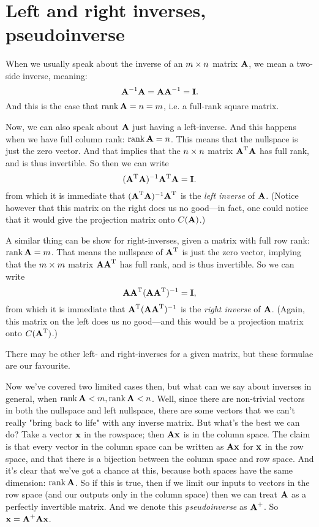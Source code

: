 \section{Left and right inverses, pseudoinverse}

When we usually speak about the inverse of an $m \times n$ matrix $\boldsymbol{\mathbf{A}}$, we mean a two-side inverse, meaning:
\[ \boldsymbol{\mathbf{A}}^{-1}\boldsymbol{\mathbf{A}} = \boldsymbol{\mathbf{A}}\boldsymbol{\mathbf{A}}^{-1} = \boldsymbol{\mathbf{I}}. \]
And this is the case that $\mathrm{rank}\, \boldsymbol{\mathbf{A}} = n = m$, i.e. a full-rank square matrix.

Now, we can also speak about $\boldsymbol{\mathbf{A}}$ just having a left-inverse. And this happens when we have full column rank: $\mathrm{rank}\, \boldsymbol{\mathbf{A}} = n$. This means that the nullspace is just the zero vector. And that implies  that the $n \times n$ matrix $\boldsymbol{\mathbf{A}}^\mathrm{T}\boldsymbol{\mathbf{A}}$ has full rank, and is thus invertible. So then we can write
\[ (\boldsymbol{\mathbf{A}}^\mathrm{T}\boldsymbol{\mathbf{A}})^{-1}\boldsymbol{\mathbf{A}}^\mathrm{T}\boldsymbol{\mathbf{A}} = \boldsymbol{\mathbf{I}}. \]
from which it is immediate that $(\boldsymbol{\mathbf{A}}^\mathrm{T}\boldsymbol{\mathbf{A}})^{-1}\boldsymbol{\mathbf{A}}^\mathrm{T}$ is the \emph{left inverse} of $\boldsymbol{\mathbf{A}}$. (Notice however that this matrix on the right does us no good---in fact, one could notice that it would give the projection matrix onto $C(\boldsymbol{\mathbf{A}})$.)

A similar thing can be show for right-inverses, given a matrix with full row rank: $\mathrm{rank}\, \boldsymbol{\mathbf{A}} = m$. That means the nullspace of $\boldsymbol{\mathbf{A}}^\mathrm{T}$ is just the zero vector, implying that the $m \times m$ matrix $\boldsymbol{\mathbf{A}}\boldsymbol{\mathbf{A}}^\mathrm{T}$ has full rank, and is thus invertible. So we can write
\[ \boldsymbol{\mathbf{A}}\boldsymbol{\mathbf{A}}^\mathrm{T}(\boldsymbol{\mathbf{A}}\boldsymbol{\mathbf{A}}^\mathrm{T})^{-1} = \boldsymbol{\mathbf{I}}, \]
from which it is immediate that $\boldsymbol{\mathbf{A}}^\mathrm{T}(\boldsymbol{\mathbf{A}}\boldsymbol{\mathbf{A}}^\mathrm{T})^{-1}$ is the \emph{right inverse} of $\boldsymbol{\mathbf{A}}$.  (Again, this matrix on the left does us no good---and this would be a projection matrix onto $C(\boldsymbol{\mathbf{A}}^\mathrm{T})$.)

\begin{remark}
There may be other left- and right-inverses for a given matrix, but these formulae are our favourite.
\end{remark}

Now we've covered two limited cases then, but what can we say about inverses in general, when $\mathrm{rank}\, \boldsymbol{\mathbf{A}} < m, \mathrm{rank}\, \boldsymbol{\mathbf{A}} < n$. Well, since there are non-trivial vectors in both the nullspace and left nullspace, there are some vectors that we can't really "bring back to life" with any inverse matrix. But what's the best we can do? Take a vector $\boldsymbol{\mathbf{x}}$ in the rowspace; then $\boldsymbol{\mathbf{A}}\boldsymbol{\mathbf{x}}$ is in the column space. The claim is that every vector in the column space can be written as $\boldsymbol{\mathbf{A}}\boldsymbol{\mathbf{x}}$ for $\boldsymbol{\mathbf{x}}$ in the row space, and that there is a bijection between the column space and row space. And it's clear that we've got a chance at this, because both spaces have the same dimension: $\mathrm{rank}\, \boldsymbol{\mathbf{A}}$. So if this is true, then if we limit our inputs to vectors in the row space (and our outputs only in the column space) then we can treat $\boldsymbol{\mathbf{A}}$ as a perfectly invertible matrix. And we denote this \emph{pseudoinverse} as $\boldsymbol{\mathbf{A}}^+$. So $\boldsymbol{\mathbf{x}} = \boldsymbol{\mathbf{A}}^+\boldsymbol{\mathbf{A}}\boldsymbol{\mathbf{x}}$.

